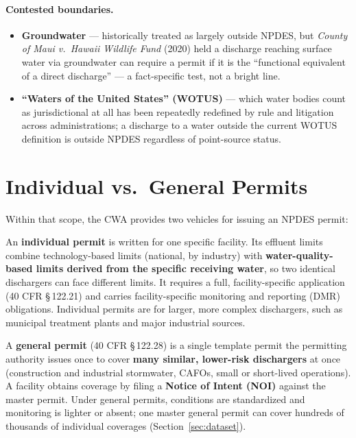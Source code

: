\documentclass[11pt]{article}
\begin{document}
\paragraph{Contested boundaries.}
\begin{itemize}
  \item \textbf{Groundwater} --- historically treated as largely outside NPDES,
        but \textit{County of Maui v.\ Hawaii Wildlife Fund} (2020) held a
        discharge reaching surface water via groundwater can require a permit if
        it is the ``functional equivalent of a direct discharge'' --- a
        fact-specific test, not a bright line.
  \item \textbf{``Waters of the United States'' (WOTUS)} --- which water bodies
        count as jurisdictional at all has been repeatedly redefined by rule and
        litigation across administrations; a discharge to a water outside the
        current WOTUS definition is outside NPDES regardless of point-source
        status.
\end{itemize}

\section{Individual vs.\ General Permits}

Within that scope, the CWA provides two vehicles for issuing an NPDES permit:

\bigskip
An \textbf{individual permit} is written for one specific facility. Its effluent
limits combine technology-based limits (national, by industry) with
\textbf{water-quality-based limits derived from the specific receiving water}, so
two identical dischargers can face different limits. It requires a full,
facility-specific application (40 CFR \S\,122.21) and carries facility-specific
monitoring and reporting (DMR) obligations. Individual permits are for larger,
more complex dischargers, such as municipal treatment plants and major industrial
sources.

\bigskip
A \textbf{general permit} (40 CFR \S\,122.28) is a single template permit the
permitting authority issues once to cover \textbf{many similar, lower-risk
dischargers} at once (construction and industrial stormwater, CAFOs, small or
short-lived operations). A facility obtains coverage by filing a \textbf{Notice of
Intent (NOI)} against the master permit. Under general permits, conditions are
standardized and monitoring is lighter or absent; one master general permit can
cover hundreds of thousands of individual coverages (Section~\ref{sec:dataset}).
\end{document}
